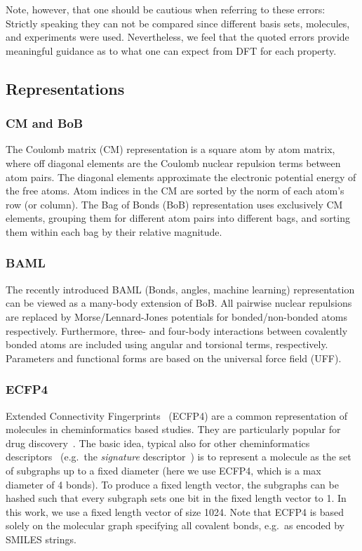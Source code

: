\documentclass[reprint, superscriptaddress,
amsmath,amssymb, aps, prb,
]{revtex4-1}
\begin{document}
{Note, however, that one should be cautious when referring to these errors: Strictly speaking they can not be 
compared since different basis sets, molecules, and experiments were used.
Nevertheless, we feel that the quoted errors provide meaningful guidance as to what one can expect from DFT for each property.

\subsection{Representations}


\subsubsection{CM and BoB}
\label{sec:CM}

The Coulomb matrix (CM) representation\cite{ML0} is a square atom by atom matrix, where off diagonal elements are the Coulomb nuclear repulsion terms between atom pairs. 
The diagonal elements approximate the electronic potential energy of the free atoms. 
Atom indices in the CM are sorted by the  norm of each atom's row (or column).
The Bag of Bonds (BoB)\cite{bob} representation uses exclusively CM elements, grouping them for different atom pairs into different bags, and sorting them within each bag by their relative magnitude.

\subsubsection{BAML}
\label{sec:BAML}
The recently introduced BAML (Bonds, angles, machine learning) representation can be viewed as a many-body extension of BoB\cite{BAML}. 
All pairwise nuclear repulsions are replaced by Morse/Lennard-Jones potentials for bonded/non-bonded atoms respectively. 
Furthermore, three- and four-body interactions between covalently bonded atoms are included using angular and torsional terms, respectively. 
Parameters and functional forms are based on the universal force field (UFF)\cite{uff}. 

\subsubsection{ECFP4}
\label{sec:ECFP4}

Extended Connectivity Fingerprints~\cite{rogers2010extended} (ECFP4) are a common representation of molecules in cheminformatics based studies. 
They are particularly popular for drug discovery~\cite{besnard2012automated,lounkine2012large,huigens2013ring}. 
The basic idea, typical also for other cheminformatics descriptors~\cite{TodeschiniConsonniHandbookDescriptor}
(e.g.~the {\em signature} descriptor~\cite{SignatureFaulon2003,Visco2002})
is to represent a molecule as the set of subgraphs up to a fixed diameter (here we use ECFP4, which is a max diameter of 4 bonds). 
To produce a fixed length vector, the subgraphs can be hashed such that every subgraph sets one bit in the fixed length vector to 1. 
In this work, we use a fixed length vector of size 1024. 
Note that ECFP4 is based solely on the molecular graph specifying all covalent bonds, e.g.~as encoded by SMILES strings.

}
\end{document}
